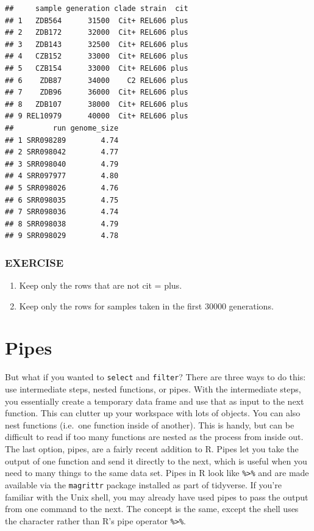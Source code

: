 \documentclass[]{book}
\providecommand{\tightlist}{%
  \setlength{\itemsep}{0pt}\setlength{\parskip}{0pt}}
\begin{document}
\begin{verbatim}
##     sample generation clade strain  cit
## 1   ZDB564      31500  Cit+ REL606 plus
## 2   ZDB172      32000  Cit+ REL606 plus
## 3   ZDB143      32500  Cit+ REL606 plus
## 4   CZB152      33000  Cit+ REL606 plus
## 5   CZB154      33000  Cit+ REL606 plus
## 6    ZDB87      34000    C2 REL606 plus
## 7    ZDB96      36000  Cit+ REL606 plus
## 8   ZDB107      38000  Cit+ REL606 plus
## 9 REL10979      40000  Cit+ REL606 plus
##         run genome_size
## 1 SRR098289        4.74
## 2 SRR098042        4.77
## 3 SRR098040        4.79
## 4 SRR097977        4.80
## 5 SRR098026        4.76
## 6 SRR098035        4.75
## 7 SRR098036        4.74
## 8 SRR098038        4.79
## 9 SRR098029        4.78
\end{verbatim}

\hypertarget{exercise-15}{%
\subsubsection*{EXERCISE}\label{exercise-15}}

\begin{enumerate}
\def\labelenumi{\arabic{enumi}.}
\tightlist
\item
  Keep only the rows that are not cit = plus.
\item
  Keep only the rows for samples taken in the first 30000 generations.
\end{enumerate}

\hypertarget{pipes}{%
\section{Pipes}\label{pipes}}

But what if you wanted to \texttt{select} and \texttt{filter}? There are three ways to do this: use intermediate steps, nested functions, or pipes. With the intermediate steps, you essentially create a temporary data frame and use that as input to the next function. This can clutter up your workspace with lots of objects. You can also nest functions (i.e.~one function inside of another). This is handy, but can be difficult to read if too many functions are nested as the process from inside out. The last option, pipes, are a fairly recent addition to R. Pipes let you take the output of one function and send it directly to the next, which is useful when you need to many things to the same data set. Pipes in R look like \texttt{\%\textgreater{}\%} and are made available via the \texttt{magrittr} package installed as part of tidyverse. If you're familiar with the Unix shell, you may already have used pipes to pass the output from one command to the next. The concept is the same, except the shell uses the \texttt{\textbar{}} character rather than R's pipe operator \texttt{\%\textgreater{}\%}.
\end{document}
